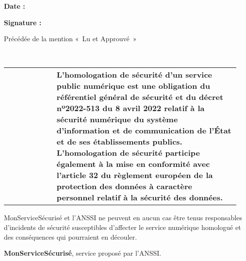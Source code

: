 \documentclass[9pt, a4paper]{article}
\begin{document}
\begin{tcolorbox}[colback=white, colframe=lisere, boxrule=1px]
    \begin{tcolorbox}[colback=white, colframe=lisere, boxrule=1px]
      \textbf{Date :}
    \end{tcolorbox}

    \begin{tcolorbox}[colback=white, colframe=lisere, boxrule=1px]
      \textbf{Signature :}

      \textcolor{gris}{Précédée de la mention « Lu et Approuvé »}

      \vskip 3cm

      ~
    \end{tcolorbox}

    \vskip 2cm

    \begin{tabular}{p{0.2\linewidth} p{0.75\linewidth}}
      [height=17mm]{badges}
      &
      \begin{minipage}[b]{\linewidth}
        \small\textbf{%
          L'homologation de sécurité d'un service public numérique est une
          obligation du référentiel général de sécurité et du décret nº2022-513
          du 8 avril 2022 relatif à la sécurité numérique du système
          d'information et de communication de l'État et de ses établissements
          publics. L'homologation de sécurité participe également à la mise en
          conformité avec l'article 32 du règlement européen de la protection des
          données à caractère personnel relatif à la sécurité des données.
        }
      \end{minipage}
    \end{tabular}

    \vskip 0.5cm

    \textcolor{gris}{%
      MonServiceSécurisé et l'ANSSI ne peuvent en aucun cas être tenus
      responsables d'incidents de sécurité susceptibles d'affecter le service
      numérique homologué et des conséquences qui pourraient en découler.
    }
  \end{tcolorbox}

  \vskip 1cm

  \textcolor{bleu}{\textbf{MonServiceSécurisé}}, service proposé par l'ANSSI.
\end{document}
